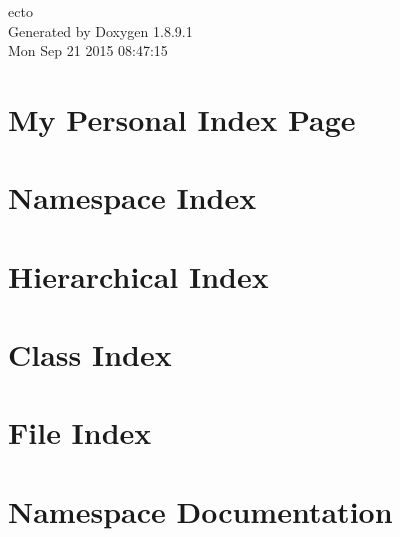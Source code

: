 \documentclass[twoside]{book}
\newcommand{\+}{\discretionary{\mbox{\scriptsize$\hookleftarrow$}}{}{}}
\newcommand{\clearemptydoublepage}{%
  \newpage{\pagestyle{empty}\cleardoublepage}%
}
\begin{document}
\hypersetup{pageanchor=false,
             bookmarks=true,
             bookmarksnumbered=true,
             pdfencoding=unicode
            }
\begin{titlepage}
\vspace*{7cm}
\begin{center}%
{\Large ecto }\\
\vspace*{1cm}
{\large Generated by Doxygen 1.8.9.1}\\
\vspace*{0.5cm}
{\small Mon Sep 21 2015 08:47:15}\\
\end{center}
\end{titlepage}
\clearemptydoublepage
\tableofcontents
\clearemptydoublepage
{}
\hypersetup{pageanchor=true}

\chapter{My Personal Index Page}
\label{index}\hypertarget{index}{}
\chapter{Namespace Index}

\chapter{Hierarchical Index}

\chapter{Class Index}

\chapter{File Index}

\chapter{Namespace Documentation}

















\end{document}
